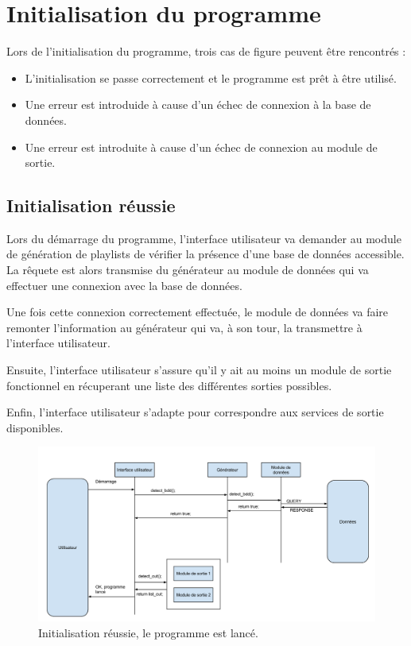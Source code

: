 
\section{Initialisation du programme}
\label{scenarii:init}
    
Lors de l'initialisation du programme, trois cas de figure peuvent être
rencontrés : 

\begin{itemize}
\item L'initialisation se passe correctement et le programme est prêt à être
utilisé.
\item Une erreur est introduide à cause d'un échec de connexion à la base de
données.
\item Une erreur est introduite à cause d'un échec de connexion au module de
sortie.
\end{itemize}

\subsection{Initialisation réussie}
\label{scenarii:init:reussie}

Lors du démarrage du programme, l'interface utilisateur va demander au 
module de génération de playlists de vérifier la présence d'une base de 
données accessible. La rêquete est alors transmise du générateur au module 
de données qui va effectuer une connexion avec la base de données.
        
Une fois cette connexion correctement effectuée, le module de données va 
faire remonter l'information au générateur qui va, à son tour, la 
transmettre à l'interface utilisateur.

Ensuite, l'interface utilisateur s'assure qu'il y ait au moins un module de 
sortie fonctionnel en récuperant une liste des différentes sorties possibles.

Enfin, l'interface utilisateur s'adapte pour correspondre aux services de 
sortie disponibles.
        
\begin{figure}[!h]
\includegraphics[width=14cm]{data/demarrage_fonctionnel.png}
\caption{Initialisation réussie, le programme est lancé.}          
\end{figure}
        
